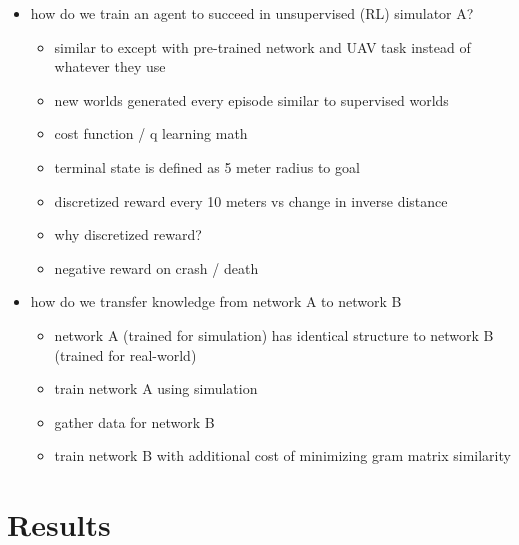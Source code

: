 \documentclass[paper=a4, fontsize=11pt]{scrartcl} %
\begin{document}
\begin{itemize}
	\item how do we train an agent to succeed in unsupervised (RL) simulator A?
	\begin{itemize}
		\item similar to \cite{Lillicrap2015} except with pre-trained network and UAV task instead of whatever they use
		\item new worlds generated every episode similar to supervised worlds
		\item cost function / q learning math
		\item terminal state is defined as 5 meter radius to goal
		\item discretized reward every 10 meters vs change in inverse distance
		\item why discretized reward?
		\item negative reward on crash / death
	\end{itemize}

	\item how do we transfer knowledge from network A to network B
	\begin{itemize}
		\item network A (trained for simulation) has identical structure to network B (trained for real-world)
		\item train network A using simulation
		\item gather data for network B
		\item train network B with additional cost of minimizing gram matrix similarity
	\end{itemize}

\end{itemize}


\section{Results}
\end{document}
